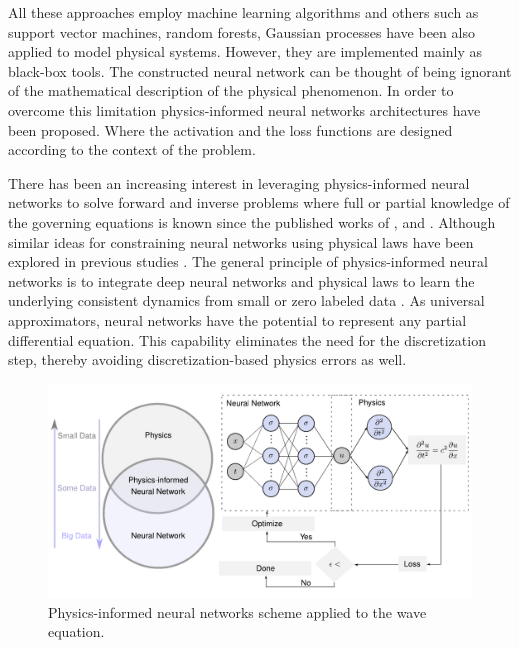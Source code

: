 \documentclass[11pt,twoside]{article}
\begin{document}
 All these approaches employ machine learning algorithms and others such as support vector machines, random forests, Gaussian processes have 
 been also applied to model physical systems. However, they are implemented mainly as black-box tools. The constructed neural network can be 
 thought of being ignorant of the mathematical description of the physical phenomenon. In order to overcome this limitation physics-informed 
 neural networks architectures have been proposed. Where the activation and the loss functions are designed according to the context of the 
 problem.

There has been an increasing interest in leveraging physics-informed neural networks to solve forward and inverse problems where full or 
partial knowledge of the governing equations is known since the published works of , 
 and . Although similar ideas for constraining neural networks using 
physical laws have been explored in previous studies \citep{lagaris_artificial_1998}. The general principle of physics-informed neural 
networks is to integrate deep neural networks and physical laws to learn the underlying consistent dynamics from small or zero labeled 
data \citep{karniadakis_physics-informed_2021}. As universal approximators, neural networks have the potential to represent any partial 
differential equation. This capability eliminates the need for the discretization step, thereby avoiding discretization-based physics errors 
as well. 

\begin{figure}[H]
\centering
    \includegraphics[width=1.0\textwidth]{figs/Escheme_PINN_waves.pdf}
    \caption{Physics-informed neural networks scheme applied to the wave equation.}
    \label{deep_learning_subset_architecture}
\end{figure}
\end{document}
